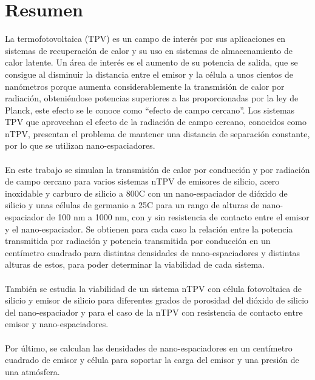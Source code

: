 \chapter{Resumen}

La termofotovoltaica (TPV) es un campo de interés por sus aplicaciones en sistemas de recuperación de calor y su uso en sistemas de almacenamiento de calor latente. Un área de interés es el aumento de su potencia de salida, que se consigue al disminuir la distancia entre el emisor y la célula a unos cientos de nanómetros porque aumenta considerablemente la transmisión de calor por radiación, obteniéndose potencias superiores a las proporcionadas por la ley de Planck, este efecto se le conoce como ``efecto de campo cercano''. Los sistemas TPV que aprovechan el efecto de la radiación de campo cercano, conocidos como nTPV, presentan el problema de mantener una distancia de separación constante, por lo que se utilizan nano-espaciadores.\\\\
En este trabajo se simulan la transmisión de calor por conducción y por radiación de campo cercano para varios sistemas nTPV de emisores de silicio, acero inoxidable y carburo de silicio a 800\textdegree C con un nano-espaciador de dióxido de silicio y unas células de germanio a 25\textdegree C para un rango de alturas de nano-espaciador de 100 nm a 1000 nm, con y sin resistencia de contacto entre el emisor y el nano-espaciador. Se obtienen para cada caso la relación entre la potencia transmitida por radiación y potencia transmitida por conducción en un centímetro cuadrado para distintas densidades de nano-espaciadores y distintas alturas de estos, para poder determinar la viabilidad de cada sistema.\\\\
También se estudia la viabilidad de un sistema nTPV con célula fotovoltaica de silicio y emisor de silicio para diferentes grados de porosidad del dióxido de silicio del nano-espaciador y para el caso de la nTPV con resistencia de contacto entre emisor y nano-espaciadores.\\\\
Por último, se calculan las densidades de nano-espaciadores en un centímetro cuadrado de emisor y célula para soportar la carga del emisor y una presión de una atmósfera. %

